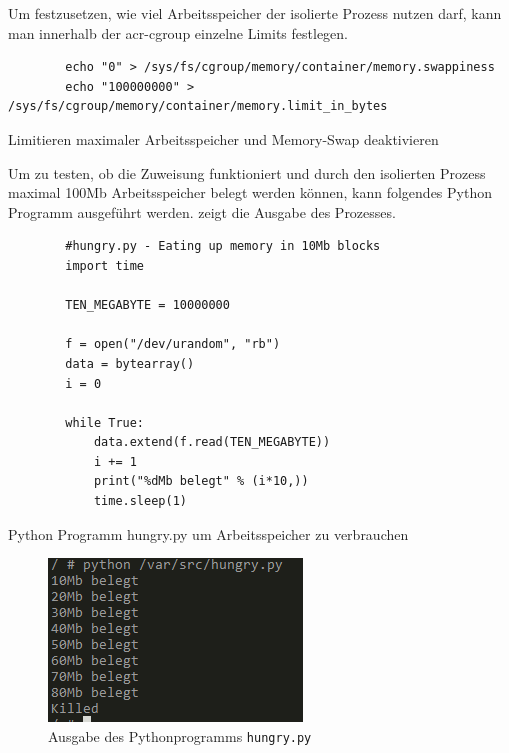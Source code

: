 Um festzusetzen, wie viel Arbeitsspeicher der isolierte Prozess nutzen darf, kann man innerhalb der \gls{acr-cgroup} einzelne Limits festlegen.

\begin{listing}[h]
	\begin{verbatim}
		echo "0" > /sys/fs/cgroup/memory/container/memory.swappiness
		echo "100000000" > /sys/fs/cgroup/memory/container/memory.limit_in_bytes
	\end{verbatim}
	\caption{Limitieren maximaler Arbeitsspeicher und Memory-Swap deaktivieren}
\end{listing}

Um zu testen, ob die Zuweisung funktioniert und durch den isolierten Prozess maximal 100Mb Arbeitsspeicher belegt werden können, kann folgendes Python Programm ausgeführt werden.  zeigt die Ausgabe des Prozesses.

\begin{listing}[p]
	\begin{verbatim}
		#hungry.py - Eating up memory in 10Mb blocks
		import time
		
		TEN_MEGABYTE = 10000000
		
		f = open("/dev/urandom", "rb")
		data = bytearray()
		i = 0
		
		while True:
			data.extend(f.read(TEN_MEGABYTE))
			i += 1
			print("%dMb belegt" % (i*10,))
			time.sleep(1)
	\end{verbatim}
	\caption{Python Programm hungry.py um Arbeitsspeicher zu verbrauchen}
	\label{lst:hungry-py}
\end{listing}


\begin{figure}[p]
	 \begin{center}
	 	\includegraphics[scale=1]{bilder/cgroup-container-killed.png}
	 	\caption{Ausgabe des Pythonprogramms \texttt{hungry.py}}
	 	\label{fig:cgroupKilled}
	 \end{center}
\end{figure}